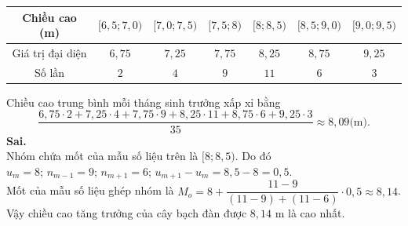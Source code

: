 \begin{ex}
{\begin{itemchoice}
\begin{tabular}{|c|c|c|c|c|c|c|}
		 \hline
		Chiều cao (m) &  $[6{,}5;7{,}0)$ & $[7{,}0;7{,}5)$ & $[7{,}5;8)$ & $[8;8{,}5)$ & $[8{,}5;9{,}0)$ & $[9{,}0;9{,}5)$ \\
		\hline 
		Giá trị đại diện & $6 {,} 75$  & $7{,}25$ & $7{,}75$ & $8{,}25$ & $8{,}75$ & $9 {,} 25$ \\
		 \hline
		Số lần & $2$  & $4$ & $9$ & $11$ & $6$ & $3$ \\
		\hline 
	\end{tabular}
	Chiều cao trung  bình mỗi tháng sinh trưởng xấp xỉ bằng
	\[\dfrac{6{,}75\cdot  2+7{,}25\cdot4+7{,}75\cdot9+8{,}25\cdot11+8{,}75\cdot6+9{,}25\cdot3}{35} \approx 8{,}09 \text{(m).}
	\] 
	\itemch \textbf{Sai.}  \\
	Nhóm chứa mốt của mẫu  số liệu trên là $[8;8{,}5)$.
	Do đó\\ $u_m=8$; $n_{m-1}=9$; $n_{m+1}=6$; $u_{m+1}-u_m=8{,}5-8=0{,}5$.\\ 
	Mốt của mẫu số liệu ghép nhóm là $M_o=8+\dfrac{11-9}{(11-9)+(11-6)}  \cdot 0{,}5\approx 8{,}14$.\\
	Vậy chiều cao tăng trưởng của cây bạch đàn được $ 8{,}14 $ m là cao nhất. 
	\end{itemchoice}
 }
\end{ex}

